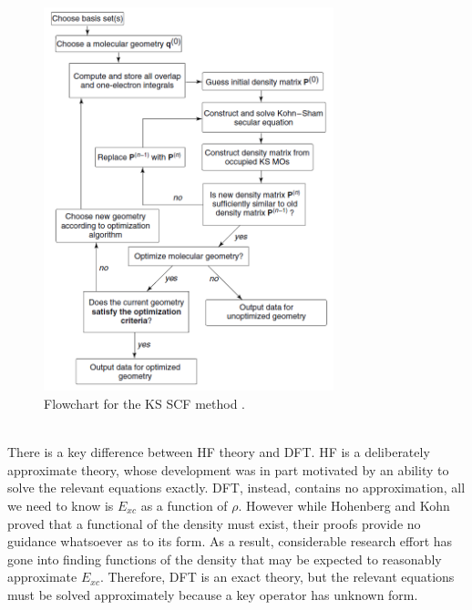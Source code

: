 \begin{figure}[ht]
  \centering
  \includegraphics[width=0.75\textwidth]{figures/KS method.png}
  \caption{Flowchart for the KS SCF method \cite{Cramer2004Sep}.} \label{KS method}
\end{figure} \\
There is a key difference between HF theory and DFT. HF is a deliberately approximate theory, whose development was in part motivated by an ability to solve the relevant equations exactly. DFT, instead, contains no approximation, all we need to know is $E_{xc}$ as a function of $\rho$. However while Hohenberg and Kohn proved that a functional of the density must exist, their proofs provide no guidance whatsoever as to its form. As a result, considerable research effort has gone into finding functions of the density that may be expected to reasonably approximate $E_{xc}$. Therefore, DFT is an exact theory, but the relevant equations must be solved approximately because a key operator has unknown form.


